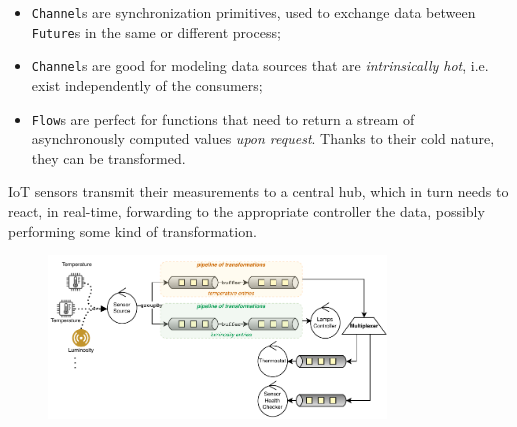 \documentclass[aspectratio=169,xcolor=dvipsnames]{beamer}
\begin{document}

\begin{frame}
    
\end{frame}


\begin{frame}
    
\end{frame}


\begin{frame}
    \begin{block}{}
        \begin{itemize}
            \item \texttt{Channel}s are synchronization primitives, used to exchange data between \texttt{Future}s in the same or different process;
            \item \texttt{Channel}s are good for modeling data sources that are \textit{intrinsically hot}, i.e. exist independently of the consumers;
            \item \texttt{Flow}s are perfect for functions that need to return a stream of asynchronously computed values \textit{upon request}. Thanks to their cold nature, they can be transformed.
        \end{itemize}
    \end{block}
\end{frame}


\begin{frame}
    \begin{example}[3]
        IoT sensors transmit their measurements to a central hub, which in turn needs to react, in real-time, forwarding to the appropriate controller the data, possibly performing some kind of transformation.
        \begin{figure}
            \centering
            \includegraphics[width=0.8\textwidth]{./images/iot.pdf}
        \end{figure}
    \end{example}
\end{frame}
\end{document}
